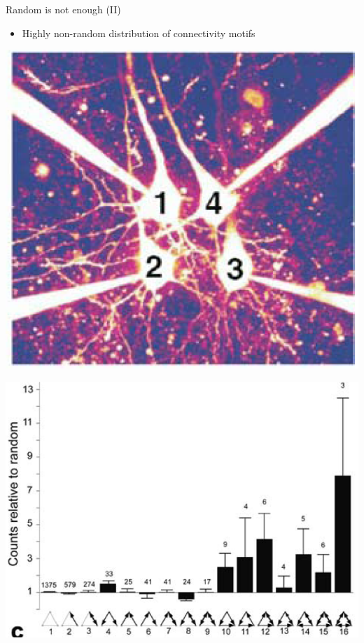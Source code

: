 \documentclass[fleqn]{beamer}
\newcommand{\ppc}[1]{\pause\setcounter{page}{#1}}
\begin{document}
\begin{frame}{Random is not enough (II)}
    \begin{itemize}
      \item Highly non-random distribution of connectivity motifs
    \end{itemize}
    \vspace*{.5cm}
    \begin{minipage}{.38\linewidth}
    \begin{center}
	\includegraphics[width=.8\linewidth]{figures/song0.png}
    \end{center}
    \begin{flushright}
	{\footnotesize \cite{Song2005}}
    \end{flushright}
    \end{minipage}\ppc{6}
    \begin{minipage}{.58\linewidth}
    \begin{center}
	\includegraphics[width=.8\linewidth]{figures/song1.png}
    \end{center}
    \end{minipage}
\end{frame}
\end{document}
